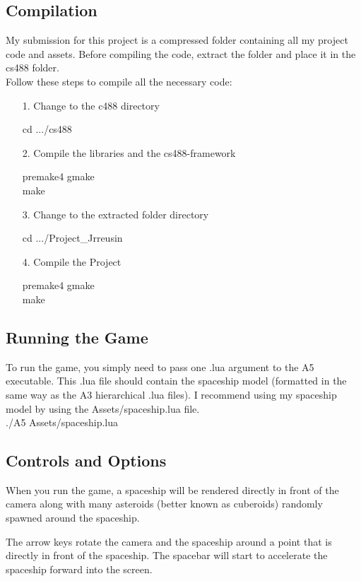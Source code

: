 \documentclass {article}
\begin{document}
\subsection{Compilation}
\hspace{0.5cm}My submission for this project is a compressed folder containing all my project code and assets. Before compiling the code, extract the folder and place it in the cs488 folder.\\

Follow these steps to compile all the necessary code:
\begin{itemize}
	\item[1.] Change to the c488 directory
	
	cd .../cs488
	\item[2.] Compile the libraries and the cs488-framework
	
	premake4 gmake\\make
	
	\item[3.] Change to the extracted folder directory
	
	cd .../Project\_Jrreusin
	
	\item[4.] Compile the Project
	
	premake4 gmake\\make
	
\end{itemize}
\subsection{Running the Game}
\hspace{0.5cm}To run the game, you simply need to pass one .lua argument to the A5 executable. This .lua file should contain the spaceship model (formatted in the same way as the A3 hierarchical .lua files). I recommend using my spaceship model by using the Assets/spaceship.lua file.\\

./A5 Assets/spaceship.lua

\subsection{Controls and Options}
\hspace{0.5cm}When you run the game, a spaceship will be rendered directly in front of the camera along with many asteroids (better known as cuberoids) randomly spawned around the spaceship.

The arrow keys rotate the camera and the spaceship around a point that is directly in front of the spaceship. The spacebar will start to accelerate the spaceship forward into the screen.
\end{document}
